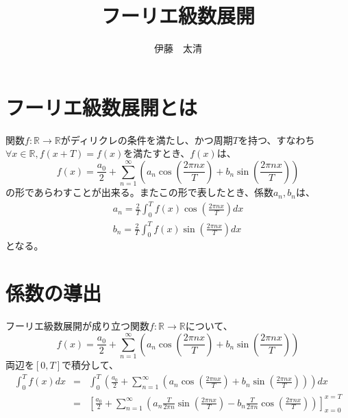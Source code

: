 \documentclass[a4paper]{jsarticle}
\title{フーリエ級数展開}
\author{伊藤　太清}
\begin{document}
\maketitle
\section{フーリエ級数展開とは}
関数$f: \mathbb{R} \longrightarrow \mathbb{R}$がディリクレの条件を満たし、かつ周期$T$を持つ、すなわち$\forall x \in \mathbb{R} , f \left( x + T \right) = f \left( x \right)$を満たすとき、$f \left( x \right)$は、
\begin{equation}
f \left( x \right) = \frac { a_0 } { 2 } + \sum _{ n = 1} ^{ \infty } \left( a_n \cos( \frac { 2 \pi nx } { T } ) + b_n \sin( \frac { 2 \pi nx } { T } ) \right)
\end{equation}
の形であらわすことが出来る。またこの形で表したとき、係数$a_n,b_n$は、
\begin{eqnarray}
a_n = \frac { 2 } { T } \int _0 ^T f \left( x \right) \cos( \frac { 2 \pi nx } { T } ) dx \\
b_n = \frac { 2 } { T } \int _0 ^T f \left( x \right) \sin( \frac { 2 \pi nx } { T } ) dx
\end{eqnarray}
となる。
\section{係数の導出}
フーリエ級数展開が成り立つ関数$f: \mathbb{R} \longrightarrow \mathbb{R}$について、
\begin{equation}
f \left( x \right) = \frac { a_0 } { 2 } + \sum _{ n = 1} ^{ \infty } \left( a_n \cos( \frac { 2 \pi nx } { T } ) + b_n \sin( \frac { 2 \pi nx } { T } ) \right)
\end{equation}
両辺を$\left[ 0,T \right]$で積分して、
\begin{eqnarray}
\int _0 ^T f \left( x \right) dx &=& \int _0 ^T \left( \frac { a_0 } { 2 } + \sum _{ n = 1} ^{ \infty } \left( a_n \cos( \frac { 2 \pi nx } { T } ) + b_n \sin( \frac { 2 \pi nx } { T } ) \right) \right) dx \nonumber \\
&=& \left[ \frac { a_0 } { 2 } + \sum _{ n = 1} ^\infty \left( a_n \frac { T } { 2 \pi n } \sin( \frac { 2 \pi nx } { T } ) - b_n \frac { T } { 2 \pi n } \cos( \frac { 2 \pi nx } { T } ) \right) \right] _{ x = 0 } ^{ x = T } \nonumber \\
\end{eqnarray}
\end{document}
